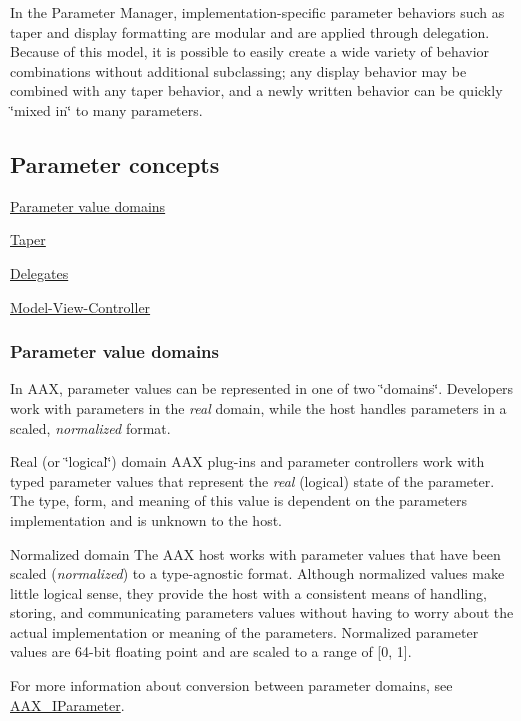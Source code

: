 In the Parameter Manager, implementation-\/specific parameter behaviors such as taper and display formatting are modular and are applied through delegation. Because of this model, it is possible to easily create a wide variety of behavior combinations without additional subclassing; any display behavior may be combined with any taper behavior, and a newly written behavior can be quickly \char`\"{}mixed in\char`\"{} to many parameters.\hypertarget{a00344_concepts}{}\subsection{Parameter concepts}\label{a00344_concepts}
\begin{DoxyItemize}
\item \hyperlink{a00344_parameter_value_domains}{Parameter value domains} \item \hyperlink{a00344_taper}{Taper} \item \hyperlink{a00344_delegates}{Delegates} \item \hyperlink{a00344_model_view_controller}{Model-\/\+View-\/\+Controller}\end{DoxyItemize}
\hypertarget{a00344_parameter_value_domains}{}\subsubsection{Parameter value domains}\label{a00344_parameter_value_domains}
In A\+A\+X, parameter values can be represented in one of two \char`\"{}domains\char`\"{}. Developers work with parameters in the {\itshape real} domain, while the host handles parameters in a scaled, {\itshape normalized} format.

\begin{DoxyParagraph}{Real (or \char`\"{}logical\char`\"{}) domain}
A\+A\+X plug-\/ins and parameter controllers work with typed parameter values that represent the {\itshape real} (logical) state of the parameter. The type, form, and meaning of this value is dependent on the parameter\textquotesingle{}s implementation and is unknown to the host.
\end{DoxyParagraph}
\begin{DoxyParagraph}{Normalized domain}
The A\+A\+X host works with parameter values that have been scaled ({\itshape normalized}) to a type-\/agnostic format. Although normalized values make little logical sense, they provide the host with a consistent means of handling, storing, and communicating parameters\textquotesingle{} values without having to worry about the actual implementation or meaning of the parameters. Normalized parameter values are 64-\/bit floating point and are scaled to a range of \mbox{[}0, 1\mbox{]}.
\end{DoxyParagraph}
For more information about conversion between parameter domains, see \hyperlink{a00108}{A\+A\+X\+\_\+\+I\+Parameter}.

